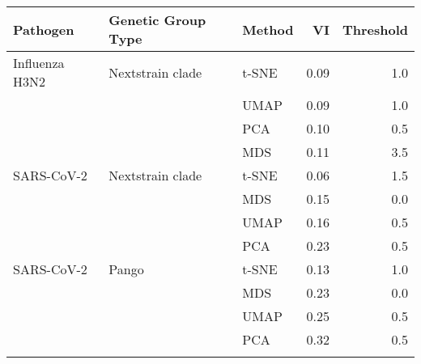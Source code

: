 \begin{tabular}{lllrr}
\toprule
      Pathogen & Genetic Group Type & Method &   VI &  Threshold \\
\midrule
Influenza H3N2 &   Nextstrain clade &  t-SNE & 0.09 &        1.0 \\
               &                    &   UMAP & 0.09 &        1.0 \\
               &                    &    PCA & 0.10 &        0.5 \\
               &                    &    MDS & 0.11 &        3.5 \\
    SARS-CoV-2 &   Nextstrain clade &  t-SNE & 0.06 &        1.5 \\
               &                    &    MDS & 0.15 &        0.0 \\
               &                    &   UMAP & 0.16 &        0.5 \\
               &                    &    PCA & 0.23 &        0.5 \\
    SARS-CoV-2 &              Pango &  t-SNE & 0.13 &        1.0 \\
               &                    &    MDS & 0.23 &        0.0 \\
               &                    &   UMAP & 0.25 &        0.5 \\
               &                    &    PCA & 0.32 &        0.5 \\
\botrule
\end{tabular}
